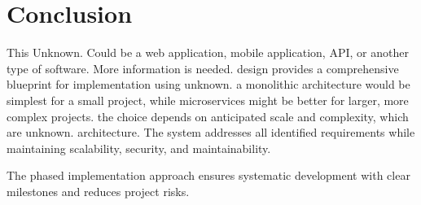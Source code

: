 \documentclass[11pt,a4paper,oneside]{article}
\begin{document}
\section{Conclusion}

This Unknown.  Could be a web application, mobile application, API, or another type of software.  More information is needed. design provides a comprehensive blueprint for implementation using unknown.  a monolithic architecture would be simplest for a small project, while microservices might be better for larger, more complex projects.  the choice depends on anticipated scale and complexity, which are unknown. architecture. The system addresses all identified requirements while maintaining scalability, security, and maintainability.

The phased implementation approach ensures systematic development with clear milestones and reduces project risks.
\end{document}
